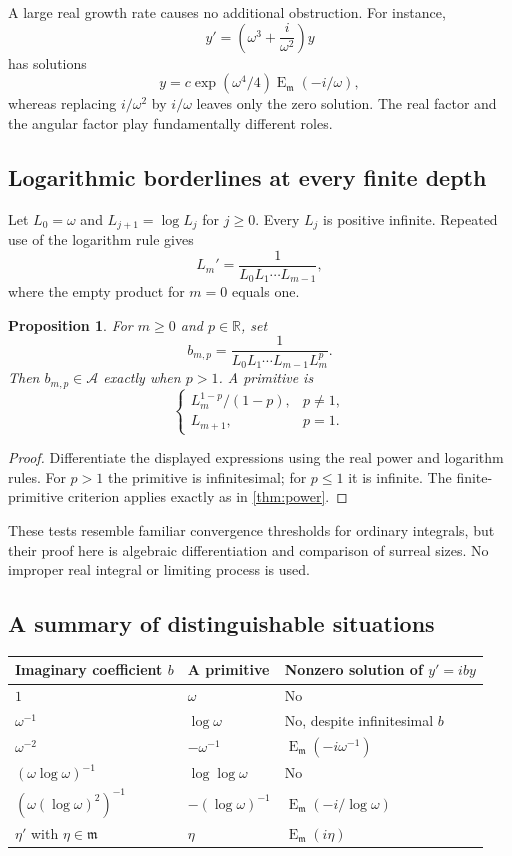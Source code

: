 \documentclass[11pt,letterpaper]{article}
\numberwithin{equation}{section}
\newtheorem{proposition}[proposition]{Proposition}
\theoremstyle{definition}
\theoremstyle{remark}
\newcommand{\R}{\mathbb R}
\newcommand{\mm}{\mathfrak m}
\newcommand{\ARate}{\mathcal A}
\newcommand{\Em}{\operatorname{E}_{\mm}}
\begin{document}
A large real growth rate causes no additional obstruction. For instance,
\[
 y'=\left(\omega^3+\frac{i}{\omega^2}\right)y
\]
has solutions
\[
 y=c\exp(\omega^4/4)\Em(-i/\omega),
\]
whereas replacing $i/\omega^2$ by $i/\omega$ leaves only the zero solution. The real factor and the angular factor play fundamentally different roles.

\subsection{Logarithmic borderlines at every finite depth}
Let $L_0=\omega$ and $L_{j+1}=\log L_j$ for $j\geq0$. Every $L_j$ is positive infinite. Repeated use of the logarithm rule gives
\[
 L_m'=\frac1{L_0L_1\cdots L_{m-1}},
\]
where the empty product for $m=0$ equals one.

\begin{proposition}\label{prop:logscales}
For $m\geq0$ and $p\in\R$, set
\[
 b_{m,p}=\frac1{L_0L_1\cdots L_{m-1}L_m^p}.
\]
Then $b_{m,p}\in\ARate$ exactly when $p>1$. A primitive is
\[
 \begin{cases}
 L_m^{1-p}/(1-p),&p\ne1,\\
 L_{m+1},&p=1.
 \end{cases}
\]
\end{proposition}
\begin{proof}
Differentiate the displayed expressions using the real power and logarithm rules. For $p>1$ the primitive is infinitesimal; for $p\leq1$ it is infinite. The finite-primitive criterion applies exactly as in \cref{thm:power}.
\end{proof}

These tests resemble familiar convergence thresholds for ordinary integrals, but their proof here is algebraic differentiation and comparison of surreal sizes. No improper real integral or limiting process is used.

\subsection{A summary of distinguishable situations}
\begin{center}\small
\begin{tabular}{L{0.25\textwidth}L{0.32\textwidth}L{0.33\textwidth}}
\toprule
Imaginary coefficient $b$ & A primitive & Nonzero solution of $y'=iby$\\
\midrule
$1$ & $\omega$ & No\\
$\omega^{-1}$ & $\log\omega$ & No, despite infinitesimal $b$\\
$\omega^{-2}$ & $-\omega^{-1}$ & $\Em(-i\omega^{-1})$\\
$(\omega\log\omega)^{-1}$ & $\log\log\omega$ & No\\
$(\omega(\log\omega)^2)^{-1}$ & $-(\log\omega)^{-1}$ & $\Em(-i/\log\omega)$\\
$\eta'$ with $\eta\in\mm$ & $\eta$ & $\Em(i\eta)$\\
\bottomrule
\end{tabular}
\end{center}
\end{document}
